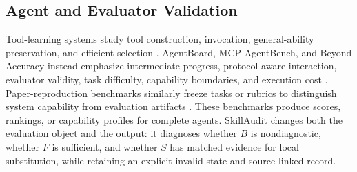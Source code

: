 \subsection{Agent and Evaluator Validation}

Tool-learning systems study tool construction, invocation, general-ability preservation, and efficient selection \cite{schick2023toolformer,gao2024confucius,hao2025citi,ma2025reusabletoolsets,jia2026autotool}. AgentBoard, MCP-AgentBench, and Beyond Accuracy instead emphasize intermediate progress, protocol-aware interaction, evaluator validity, task difficulty, capability boundaries, and execution cost \cite{ma2024agentboard,guo2026mcpagentbench,wang2026beyondaccuracy}. Paper-reproduction benchmarks similarly freeze tasks or rubrics to distinguish system capability from evaluation artifacts \cite{starace2025paperbench,zhao2025autoreproduce}. These benchmarks produce scores, rankings, or capability profiles for complete agents. SkillAudit changes both the evaluation object and the output: it diagnoses whether $B$ is nondiagnostic, whether $F$ is sufficient, and whether $S$ has matched evidence for local substitution, while retaining an explicit invalid state and source-linked record.

